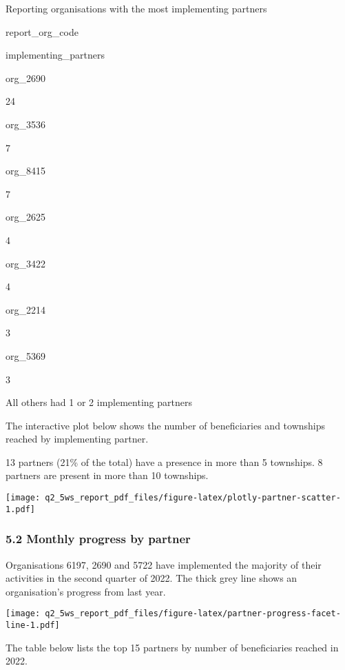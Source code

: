 \documentclass[
]{article}
\begin{document}
Reporting organisations with the most implementing partners

report\_org\_code

implementing\_partners

org\_2690

24

org\_3536

7

org\_8415

7

org\_2625

4

org\_3422

4

org\_2214

3

org\_5369

3

All others had 1 or 2 implementing partners

The interactive plot below shows the number of beneficiaries and
townships reached by implementing partner.

13 partners (21\% of the total) have a presence in more than 5
townships. 8 partners are present in more than 10 townships.

\texttt{[image: q2\_5ws\_report\_pdf\_files/figure-latex/plotly-partner-scatter-1.pdf]}

\hypertarget{monthly-progress-by-partner}{%
\subsubsection{5.2 Monthly progress by
partner}\label{monthly-progress-by-partner}}

Organisations 6197, 2690 and 5722 have implemented the majority of their
activities in the second quarter of 2022. The thick grey line shows an
organisation's progress from last year.

\texttt{[image: q2\_5ws\_report\_pdf\_files/figure-latex/partner-progress-facet-line-1.pdf]}

The table below lists the top 15 partners by number of beneficiaries
reached in 2022.
\end{document}

